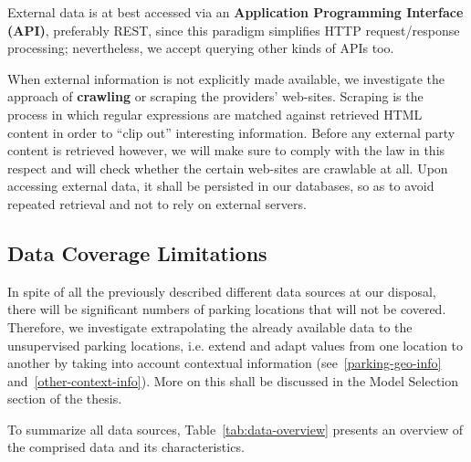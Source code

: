 \documentclass{article}
\begin{document}
External data is at best accessed via an \textbf{Application Programming Interface (API)}, preferably REST, since this paradigm simplifies HTTP request/response processing; nevertheless, we accept querying other kinds of APIs too. 

When external information is not explicitly made available, we investigate the approach of \textbf{crawling} or scraping the providers' web-sites. Scraping is the process in which regular expressions are matched against retrieved HTML content in order to ``clip out'' interesting information. Before any external party content is retrieved however, we will make sure to comply with the law in this respect and will check whether the certain web-sites are crawlable at all. Upon accessing external data, it shall be persisted in our databases, so as to avoid repeated retrieval and not to rely on external servers.

\subsection{Data Coverage Limitations}
In spite of all the previously described different data sources at our disposal, there will be significant numbers of parking locations that will not be covered. Therefore, we investigate extrapolating the already available data to the unsupervised parking locations, i.e. extend and adapt values from one location to another by taking into account contextual information (see~\ref{parking-geo-info} and~\ref{other-context-info}). More on this shall be discussed in the Model Selection section of the thesis.

\vspace{2mm}
To summarize all data sources, Table~\ref{tab:data-overview} presents an overview of the comprised data and its characteristics.
\end{document}
